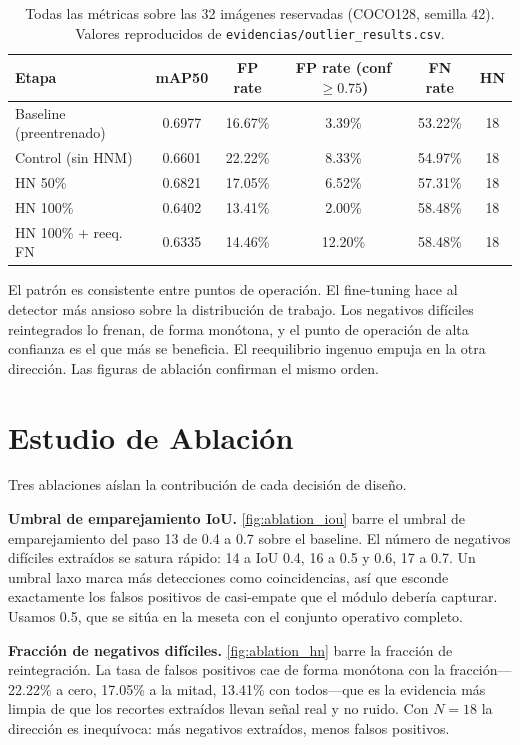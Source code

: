 \documentclass[conference]{IEEEtran}
\begin{document}
\begin{table}[htbp]
\caption{Todas las métricas sobre las 32 imágenes reservadas (COCO128,
semilla 42). Valores reproducidos de
\texttt{evidencias/outlier\_results.csv}.}
\label{tab:results}
\centering
\footnotesize
\begin{tabular}{lccccc}
\toprule
Etapa & mAP50 & FP rate & FP rate (conf $\geq 0.75$) & FN rate & HN \\
\midrule
Baseline (preentrenado) & 0.6977 & 16.67\% & 3.39\% & 53.22\% & 18 \\
Control (sin HNM)       & 0.6601 & 22.22\% & 8.33\% & 54.97\% & 18 \\
HN 50\%                 & 0.6821 & 17.05\% & 6.52\% & 57.31\% & 18 \\
HN 100\%                & 0.6402 & 13.41\% & 2.00\% & 58.48\% & 18 \\
HN 100\% + reeq. FN     & 0.6335 & 14.46\% & 12.20\% & 58.48\% & 18 \\
\bottomrule
\end{tabular}
\end{table}

El patrón es consistente entre puntos de operación. El fine-tuning hace al
detector más ansioso sobre la distribución de trabajo. Los negativos difíciles
reintegrados lo frenan, de forma monótona, y el punto de operación de alta
confianza es el que más se beneficia. El reequilibrio ingenuo empuja en la otra
dirección. Las figuras de ablación confirman el mismo orden.

\section{Estudio de Ablación}
Tres ablaciones aíslan la contribución de cada decisión de diseño.

\textbf{Umbral de emparejamiento IoU.} \cref{fig:ablation_iou} barre el umbral
de emparejamiento del paso 13 de 0.4 a 0.7 sobre el baseline. El número de
negativos difíciles extraídos se satura rápido: 14 a IoU 0.4, 16 a 0.5 y 0.6,
17 a 0.7. Un umbral laxo marca más detecciones como coincidencias, así que
esconde exactamente los falsos positivos de casi-empate que el módulo debería
capturar. Usamos 0.5, que se sitúa en la meseta con el conjunto operativo
completo.

\textbf{Fracción de negativos difíciles.} \cref{fig:ablation_hn} barre la
fracción de reintegración. La tasa de falsos positivos cae de forma monótona
con la fracción---22.22\% a cero, 17.05\% a la mitad, 13.41\% con todos---que
es la evidencia más limpia de que los recortes extraídos llevan señal real y no
ruido. Con \(N=18\) la dirección es inequívoca: más negativos extraídos, menos
falsos positivos.
\end{document}
